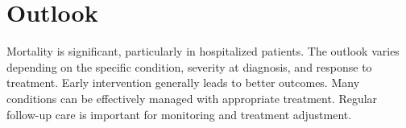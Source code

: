 \section{Outlook}
Mortality is significant, particularly in hospitalized patients. The outlook varies depending on the specific condition, severity at diagnosis, and response to treatment. Early intervention generally leads to better outcomes. Many conditions can be effectively managed with appropriate treatment. Regular follow-up care is important for monitoring and treatment adjustment.
